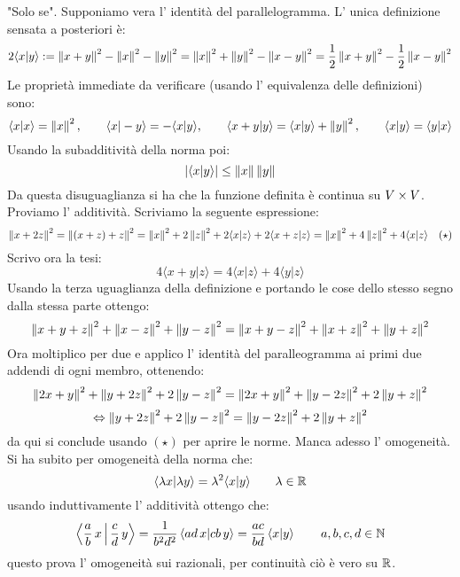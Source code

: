  "Solo se". Supponiamo vera l' identità del parallelogramma. L' unica definizione sensata a posteriori è:
$$ 2\langle x | y\rangle :=\left \| x+y \right\|^2-\left \| x \right\|^2-\left \| y \right\|^2=\left \| x \right\|^2+\left \| y \right\|^2-\left \| x-y \right\|^2=\frac{1}{2}\left \| x+y \right\|^2-\frac{1}{2}\left \| x-y \right\|^2 $$
Le proprietà immediate da verificare (usando l' equivalenza delle definizioni) sono:
$$ \langle x |x \rangle=\left \| x \right\|^2,\qquad  \langle x | -y \rangle = - \langle x | y \rangle, \qquad \langle x+y|y\rangle=\langle x|y\rangle +\left \| y \right\|^2,\qquad \langle x |y \rangle=\langle y |x \rangle $$
Usando la subadditività della norma poi:
$$ \vert{\langle x|y\rangle}\vert \leq \left \| x \right\|\left \| y \right\| $$
Da questa disuguaglianza si ha che la funzione definita è continua su $V\times V$.
Proviamo l' additività. Scriviamo la seguente espressione:
$$ \left \| x+2z \right\|^2=\left \| (x+z)+z \right\|^2=\left \| x \right\|^2+2\left \| z \right\|^2+2\langle x| z\rangle +2\langle x+z|z\rangle=\left \| x \right\|^2+4\left \| z \right\|^2+4\langle x| z\rangle\quad (\star) $$
Scrivo ora la tesi:
$$ 4\langle x+y |z\rangle=4\langle x|z \rangle + 4\langle y|z \rangle $$
Usando la terza uguaglianza della definizione e portando le cose dello stesso segno dalla stessa parte ottengo:
$$ \left \| x+y+z \right\|^2+\left \| x-z \right\|^2+\left \| y-z \right\|^2=\left \| x+y-z \right\|^2+\left \| x+z \right\|^2+\left \| y+z \right\|^2 $$
Ora moltiplico per due e applico l' identità del paralleogramma ai primi due addendi di ogni membro, ottenendo:
$$ \left \| 2x+y \right\|^2+\left \| y+2z \right\|^2+2\left \| y-z \right\|^2=\left \| 2x+y \right\|^2+\left \| y-2z \right\|^2+2\left \| y+z \right\|^2 $$
$$ \Leftrightarrow \left \| y+2z \right\|^2+2\left \| y-z \right\|^2=\left \| y-2z \right\|^2+2\left \| y+z \right\|^2 $$
da qui si conclude usando $(\star)$ per aprire le norme.
Manca adesso l' omogeneità. Si ha subito per omogeneità della norma che:
$$ \langle \lambda x|\lambda y\rangle= \lambda ^2 \langle x|y\rangle  \qquad \lambda\in \mathbb{R} $$
usando induttivamente l' additività ottengo che:
$$ \Braket{\frac{a}{b}\, x|\frac{c}{d}\, y}=\frac{1}{b^2d^2}\left\langle ad\, x|cb\, y\right\rangle=\frac{ac}{bd}\left\langle x|y\right\rangle\qquad a,b,c,d \in \mathbb{N} $$
questo prova l' omogeneità sui razionali, per continuità ciò è vero su $\mathbb{R}$. 

